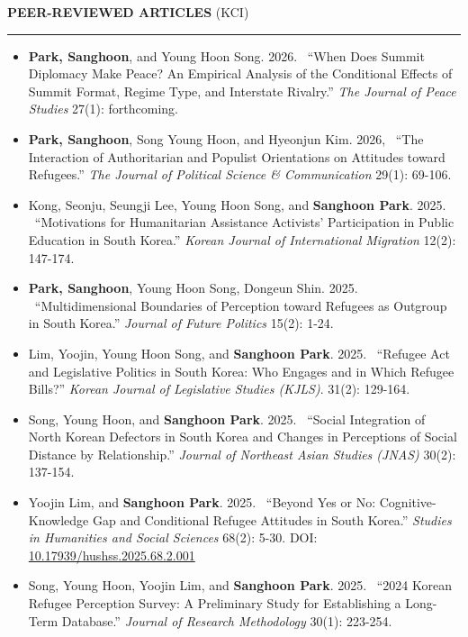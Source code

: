 \documentclass[
  16,
]{article}
\begin{document}
\vspace{7pt}

\begin{large}{\bf PEER-REVIEWED ARTICLES} (KCI)
  \vspace{3pt}
  \hrule
\end{large}
  \begin{itemize}
    \item[21.] \textbf{Park, Sanghoon}, and Young Hoon Song.  2026. ~``When Does Summit Diplomacy Make Peace? An Empirical Analysis of the Conditional Effects of Summit Format, Regime Type, and Interstate Rivalry.'' \textit{The Journal of Peace Studies} 27(1): forthcoming.
    \item[20.] \textbf{Park, Sanghoon}, Song Young Hoon, and Hyeonjun Kim. 2026, ~``The Interaction of Authoritarian and Populist Orientations on Attitudes toward Refugees.'' \textit{The Journal of Political Science \& Communication} 29(1): 69-106.
    \item[19.] Kong, Seonju, Seungji Lee, Young Hoon Song, and \textbf{Sanghoon Park}. 2025. ~``Motivations for Humanitarian Assistance Activists' Participation in Public Education in South Korea.'' \textit{Korean Journal of International Migration} 12(2): 147-174.
    \item[18.] \textbf{Park, Sanghoon}, Young Hoon Song, Dongeun Shin. 2025.  ~``Multidimensional Boundaries of Perception toward Refugees as Outgroup in South Korea.''  \textit{Journal of Future Politics} 15(2): 1-24. 
    \item[17.] Lim, Yoojin, Young Hoon Song, and \textbf{Sanghoon Park}. 2025. ~``Refugee Act and Legislative Politics in South Korea: Who Engages and in Which Refugee Bills?'' \textit{Korean Journal of Legislative Studies (KJLS)}. 31(2): 129-164.
    \item[16.] Song, Young Hoon, and \textbf{Sanghoon Park}. 2025. ~``Social Integration of North Korean Defectors in South Korea and Changes in Perceptions of Social Distance by Relationship.'' \textit{Journal of Northeast Asian Studies (JNAS)} 30(2): 137-154.
    \item[15.] Yoojin Lim, and \textbf{Sanghoon Park}. 2025. ~``Beyond Yes or No: Cognitive-Knowledge Gap and Conditional Refugee Attitudes in South Korea.'' \textit{Studies in Humanities and Social Sciences} 68(2): 5-30. DOI: \href{https://doi.org/10.17939/hushss.2025.68.2.001}{10.17939/hushss.2025.68.2.001}
    \item[14.] Song, Young Hoon, Yoojin Lim, and \textbf{Sanghoon Park}. 2025. ~``2024 Korean Refugee Perception Survey: A Preliminary Study for Establishing a Long-Term Database.'' \textit{Journal of Research Methodology} 30(1): 223-254.

\end{itemize}
\end{document}
